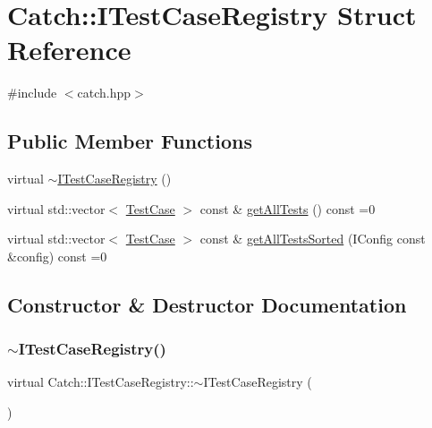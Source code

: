 \hypertarget{struct_catch_1_1_i_test_case_registry}{}\section{Catch\+:\+:I\+Test\+Case\+Registry Struct Reference}
\label{struct_catch_1_1_i_test_case_registry}


{\ttfamily \#include $<$catch.\+hpp$>$}

\subsection*{Public Member Functions}
\begin{DoxyCompactItemize}
\item 
virtual \hyperlink{struct_catch_1_1_i_test_case_registry_ae14798f05ac8e2b18cff532849a4da81}{$\sim$\+I\+Test\+Case\+Registry} ()
\item 
virtual std\+::vector$<$ \hyperlink{class_catch_1_1_test_case}{Test\+Case} $>$ const  \& \hyperlink{struct_catch_1_1_i_test_case_registry_ad6e4d4a621655123f73ae98cfeda063d}{get\+All\+Tests} () const =0
\item 
virtual std\+::vector$<$ \hyperlink{class_catch_1_1_test_case}{Test\+Case} $>$ const  \& \hyperlink{struct_catch_1_1_i_test_case_registry_a33e46639d0319d35497c05bb5d02be5a}{get\+All\+Tests\+Sorted} (I\+Config const \&config) const =0
\end{DoxyCompactItemize}


\subsection{Constructor \& Destructor Documentation}
\hypertarget{struct_catch_1_1_i_test_case_registry_ae14798f05ac8e2b18cff532849a4da81}{}\label{struct_catch_1_1_i_test_case_registry_ae14798f05ac8e2b18cff532849a4da81} 
\subsubsection{\texorpdfstring{$\sim$\+I\+Test\+Case\+Registry()}{~ITestCaseRegistry()}}
{\footnotesize\ttfamily virtual Catch\+::\+I\+Test\+Case\+Registry\+::$\sim$\+I\+Test\+Case\+Registry (\begin{DoxyParamCaption}{ }\end{DoxyParamCaption})\hspace{0.3cm}{\ttfamily [virtual]}}




